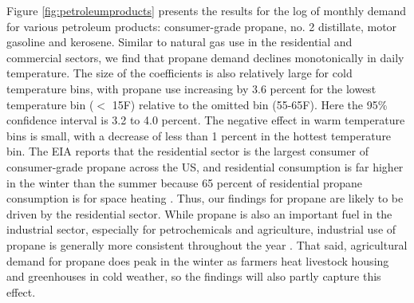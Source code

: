 \documentclass[11pt]{article}
\begin{document}
Figure \ref{fig:petroleumproducts} presents the results for the log of monthly demand for various petroleum products: consumer-grade propane, no. 2 distillate, motor gasoline and kerosene. Similar to natural gas use in the residential and commercial sectors, we find that propane demand declines monotonically in daily temperature. The size of the coefficients is also relatively large for cold temperature bins, with propane use increasing by 3.6 percent for the lowest temperature bin ($<$ 15\degree F) relative to the omitted bin (55-65\degree F). Here the 95\% confidence interval is 3.2 to 4.0 percent. The negative effect in warm temperature bins is small, with a decrease of less than 1 percent in the hottest temperature bin. The EIA reports that the residential sector is the largest consumer of consumer-grade propane across the US, and residential consumption is far higher in the winter than the summer because 65 percent of residential propane consumption is for space heating \citep{EIA2020b}. Thus, our findings for propane are likely to be driven by the residential sector. While propane is also an important fuel in the industrial sector, especially for petrochemicals and agriculture, industrial use of propane is generally more consistent throughout the year \citep{EIA2020b}. That said, agricultural demand for propane does peak in the winter as farmers heat livestock housing and greenhouses in cold weather, so the findings will also partly capture this effect.
\end{document}
